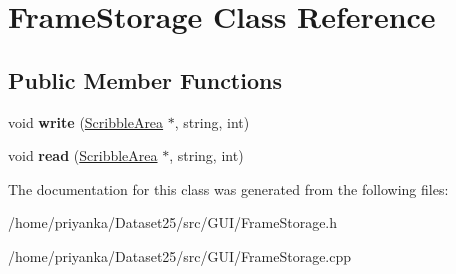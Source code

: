 \hypertarget{classFrameStorage}{\section{\-Frame\-Storage \-Class \-Reference}
\label{classFrameStorage}
}
\subsection*{\-Public \-Member \-Functions}
\begin{DoxyCompactItemize}
\item 
\hypertarget{classFrameStorage_aa9e09c316ad7e2496689f3751d045b75}{void {\bfseries write} (\hyperlink{classScribbleArea}{\-Scribble\-Area} $\ast$, string, int)}\label{classFrameStorage_aa9e09c316ad7e2496689f3751d045b75}

\item 
\hypertarget{classFrameStorage_a2e13939f099ca98baef14e6fe58883e5}{void {\bfseries read} (\hyperlink{classScribbleArea}{\-Scribble\-Area} $\ast$, string, int)}\label{classFrameStorage_a2e13939f099ca98baef14e6fe58883e5}

\end{DoxyCompactItemize}


\-The documentation for this class was generated from the following files\-:\begin{DoxyCompactItemize}
\item 
/home/priyanka/\-Dataset25/src/\-G\-U\-I/\-Frame\-Storage.\-h\item 
/home/priyanka/\-Dataset25/src/\-G\-U\-I/\-Frame\-Storage.\-cpp\end{DoxyCompactItemize}
